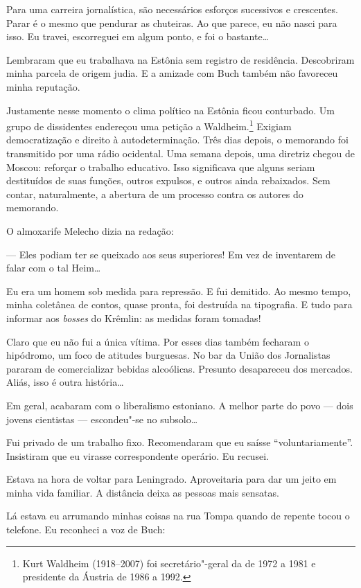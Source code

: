 Para uma carreira jornalística, são necessários esforços sucessivos e
crescentes. Parar é o mesmo que pendurar as chuteiras. Ao que parece, eu
não nasci para isso. Eu travei, escorreguei em algum ponto, e foi o
bastante\ldots{}

Lembraram que eu trabalhava na Estônia sem registro de residência.
Descobriram minha parcela de origem judia. E a amizade com Buch também
não favoreceu minha reputação.

Justamente nesse momento o clima político na Estônia ficou conturbado.
Um grupo de dissidentes endereçou uma petição a Waldheim.\footnote{Kurt
  Waldheim (1918--2007) foi secretário"-geral da  de 1972 a 1981 e
  presidente da Áustria de 1986 a 1992.} Exigiam democratização e
direito à autodeterminação. Três dias depois, o memorando foi
transmitido por uma rádio ocidental. Uma semana depois, uma diretriz
chegou de Moscou: reforçar o trabalho educativo. Isso significava que
alguns seriam destituídos de suas funções, outros expulsos, e outros
ainda rebaixados. Sem contar, naturalmente, a abertura de um processo
contra os autores do memorando.

O almoxarife Melecho dizia na redação:

--- Eles podiam ter se queixado aos seus superiores! Em vez de
inventarem de falar com o tal Heim\ldots{}

Eu era um homem sob medida para repressão. E fui demitido. Ao mesmo
tempo, minha coletânea de contos, quase pronta, foi destruída na
tipografia. E tudo para informar aos \emph{bosses} do Krêmlin: as
medidas foram tomadas!

Claro que eu não fui a única vítima. Por esses dias também fecharam o
hipódromo, um foco de atitudes burguesas. No bar da União dos
Jornalistas pararam de comercializar bebidas alcoólicas. Presunto
desapareceu dos mercados. Aliás, isso é outra história\ldots{}

Em geral, acabaram com o liberalismo estoniano. A melhor parte do povo
--- dois jovens cientistas --- escondeu"-se no subsolo\ldots{}

Fui privado de um trabalho fixo. Recomendaram que eu saísse
``voluntariamente''. Insistiram que eu virasse correspondente operário.
Eu recusei.

Estava na hora de voltar para Leningrado. Aproveitaria para dar um jeito
em minha vida familiar. A distância deixa as pessoas mais sensatas.

Lá estava eu arrumando minhas coisas na rua Tompa quando de repente
tocou o telefone. Eu reconheci a voz de Buch:

